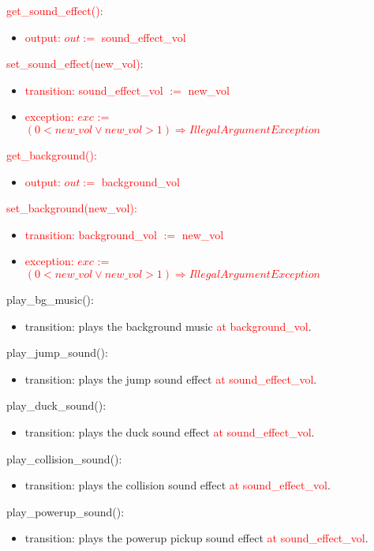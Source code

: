 \documentclass[12pt]{article}
\begin{document}
\noindent \textcolor{red}{get\_sound\_effect():}
\begin{itemize}
    \item \textcolor{red}{output: $out :=$ sound\_effect\_vol }
\end{itemize}

\noindent \textcolor{red}{set\_sound\_effect(new\_vol):}
\begin{itemize}
    \item \textcolor{red}{transition:   sound\_effect\_vol $:=$ new\_vol}
    \item \textcolor{red}{exception: $exc$ := $(0 < new\_vol \lor new\_vol > 1) \Rightarrow IllegalArgumentException $}
\end{itemize}

\noindent \textcolor{red}{get\_background():}
\begin{itemize}
    \item \textcolor{red}{output: $out :=$ background\_vol }
\end{itemize}

\noindent \textcolor{red}{set\_background(new\_vol):}
\begin{itemize}
    \item \textcolor{red}{transition:   background\_vol $:=$ new\_vol}
    \item \textcolor{red}{exception: $exc$ := $(0 < new\_vol \lor new\_vol > 1) \Rightarrow IllegalArgumentException $}
\end{itemize}


\noindent  play\_bg\_music():
\begin{itemize}
    \item transition: plays the background music \textcolor{red}{at background\_vol}.
\end{itemize}
\noindent play\_jump\_sound():
\begin{itemize}
    \item transition: plays the jump sound effect \textcolor{red}{at sound\_effect\_vol}.
\end{itemize}
\noindent  play\_duck\_sound():
\begin{itemize}
    \item transition: plays the duck sound effect \textcolor{red}{at sound\_effect\_vol}.
\end{itemize}
\noindent  play\_collision\_sound():
\begin{itemize}
    \item transition: plays the collision sound effect \textcolor{red}{at sound\_effect\_vol}.
\end{itemize}
\noindent  play\_powerup\_sound():
\begin{itemize}
    \item transition: plays the powerup pickup sound effect \textcolor{red}{at sound\_effect\_vol}.
\end{itemize}
\end{document}
